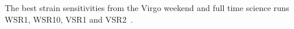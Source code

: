 The best strain sensitivities from the Virgo weekend and full
time science runs WSR1, WSR10, VSR1 and VSR2~\cite{VIRGOcurves, VSR2paper}.